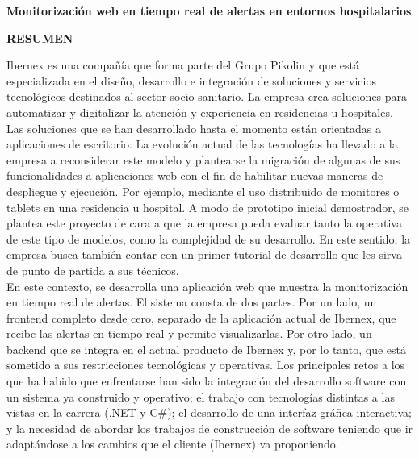\begin{center}
{\Large \bfseries Monitorización web en tiempo real de alertas en entornos hospitalarios}

\vspace{1cm}
{\Large \bfseries RESUMEN}

\end{center}

Ibernex es una compañía que forma parte del Grupo Pikolin y que está especializada en el diseño, desarrollo e integración de soluciones y servicios tecnológicos destinados al sector socio-sanitario. La empresa crea soluciones para automatizar y digitalizar la atención y experiencia en residencias u hospitales. \\


Las soluciones que se han desarrollado hasta el momento están orientadas a aplicaciones de escritorio. La evolución actual de las tecnologías ha llevado a la empresa a reconsiderar este modelo y plantearse la migración de algunas de sus funcionalidades a aplicaciones web con el fin de habilitar nuevas maneras de despliegue y ejecución. Por ejemplo, mediante el uso distribuido de monitores o tablets en una residencia u hospital. A modo de prototipo inicial demostrador, se plantea este proyecto de cara a que la empresa pueda evaluar tanto la operativa de este tipo de modelos, como la complejidad de su desarrollo. En este sentido, la empresa busca también contar con un primer tutorial de desarrollo que les sirva de punto de partida a sus técnicos. \\


En este contexto, se desarrolla una aplicación web que muestra la monitorización en tiempo real de alertas. El sistema consta de dos partes. Por un lado, un frontend completo desde cero, separado de la aplicación actual de Ibernex, que recibe las alertas en tiempo real y permite visualizarlas. Por otro lado, un backend que se integra en el actual producto de Ibernex y, por lo tanto, que está sometido a sus restricciones tecnológicas y operativas.
Los principales retos a los que ha habido que enfrentarse han sido la integración del desarrollo software con un sistema ya construido y operativo; el trabajo con tecnologías distintas a las vistas en la carrera (.NET y C\#); el desarrollo de una interfaz gráfica interactiva; y la necesidad de abordar los trabajos de construcción de software teniendo que ir adaptándose a los cambios que el cliente (Ibernex) va proponiendo.

